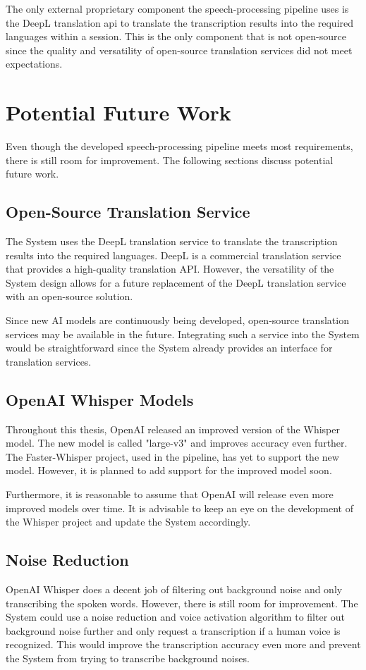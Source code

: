 The only external proprietary component the speech-processing pipeline uses is the DeepL translation \ac{api} to 
translate the transcription results into the required languages within a session. This is the only component that is 
not open-source since the quality and versatility of open-source translation services did not meet expectations.


\section{Potential Future Work}
Even though the developed speech-processing pipeline meets most requirements, there is still room for improvement. 
The following sections discuss potential future work.

\subsection{Open-Source Translation Service}

The System uses the DeepL translation service to translate the transcription results into the required languages. 
DeepL is a commercial translation service that provides a high-quality translation API. However, the versatility of the 
System design allows for a future replacement of the DeepL translation service with an open-source solution. 

Since new AI models are continuously being developed, open-source translation services may be available in the future. 
Integrating such a service into the System would be straightforward since the System already provides an interface for 
translation services.

\subsection{OpenAI Whisper Models}

Throughout this thesis, OpenAI released an improved version of the Whisper model. The new model is called "large-v3" 
and improves accuracy even further. The Faster-Whisper project, used in the pipeline, has yet to support the new model. 
However, it is planned to add support for the improved model soon.

Furthermore, it is reasonable to assume that OpenAI will release even more improved models over time. It is advisable 
to keep an eye on the development of the Whisper project and update the System accordingly.

\subsection{Noise Reduction}

OpenAI Whisper does a decent job of filtering out background noise and only transcribing the spoken words. However, 
there is still room for improvement. The System could use a noise reduction and voice activation algorithm to filter 
out background noise further and only request a transcription if a human voice is recognized. This would improve the 
transcription accuracy even more and prevent the System from trying to transcribe background noises.

